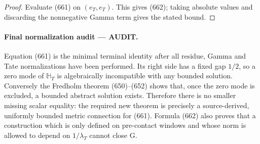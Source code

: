 \documentclass[11pt]{article}
\newcommand{\AUDIT}{\textcolor{orange!75!black}{\textbf{AUDIT}}}
\begin{document}
\begin{proof}
Evaluate (661) on \((e_T,e_T)\).  This gives (662); taking absolute values
and discarding the nonnegative Gamma term gives the stated bound.
\end{proof}

\paragraph{Final normalization audit --- \AUDIT.}
Equation (661) is the minimal terminal identity after all residue,
Gamma and Tate normalizations have been performed.  Its right side has a
fixed gap \(1/2\), so a zero mode of \(\mathbb H_T\) is algebraically
incompatible with any bounded solution.  Conversely the Fredholm theorem
(650)--(652) shows that, once the zero mode is excluded, a bounded abstract
solution exists.  Therefore there is no smaller missing scalar equality:
the required new theorem is precisely a source-derived, uniformly bounded
metric connection for (661).  Formula (662) also proves that a construction
which is only defined on pre-contact windows and whose norm is allowed to
depend on \(1/\lambda_T\) cannot close G.
\end{document}
